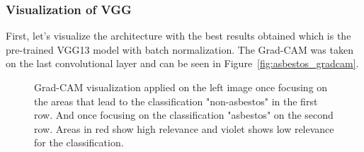 \subsubsection{Visualization of VGG}

First, let's visualize the architecture with the best results obtained which is the pre-trained VGG13 model with batch normalization. The Grad-CAM was taken on the last convolutional layer and can be seen in Figure~\ref{fig:asbestos_gradcam}. 

\begin{figure}[!h]
\centering
\caption{Grad-CAM visualization applied on the left image once focusing on the areas that lead to the classification "non-asbestos" in the first row. And once focusing on the classification "asbestos" on the second row. Areas in red show high relevance and violet shows low relevance for the classification.}


\end{figure}

